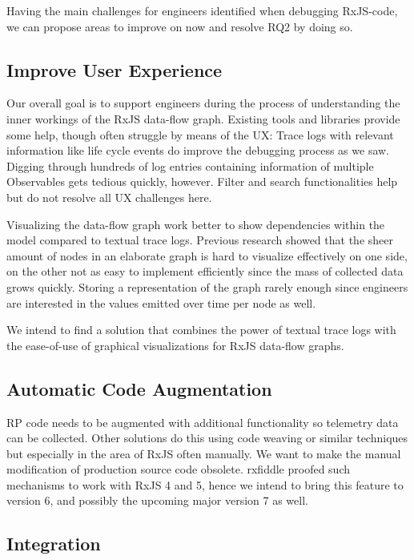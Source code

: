 \documentclass[12pt,a4paper]{article}
\begin{document}
Having the main challenges for engineers identified when debugging RxJS-code, we can propose areas to improve on now and resolve RQ2 by doing so.

\subsection{Improve User Experience}

Our overall goal is to support engineers during the process of understanding the inner workings of the RxJS data-flow graph. Existing tools and libraries provide some help, though often struggle by means of the UX: Trace logs with relevant information like life cycle events do improve the debugging process as we saw. Digging through hundreds of log entries containing information of multiple Observables gets tedious quickly, however. Filter and search functionalities help but do not resolve all UX challenges here.

Visualizing the data-flow graph work better to show dependencies within the model compared to textual trace logs. Previous research showed that the sheer amount of nodes in an elaborate graph is hard to visualize effectively \cite{10.1145/3180155.3180156} on one side, on the other not as easy to implement efficiently since the mass of collected data grows quickly. Storing a representation of the graph rarely enough since engineers are interested in the values emitted over time per node as well.

We intend to find a solution that combines the power of textual trace logs with the ease-of-use of graphical visualizations for RxJS data-flow graphs.

\subsection{Automatic Code Augmentation}

RP code needs to be augmented with additional functionality so telemetry data can be collected. Other solutions do this using code weaving\cite{10.1145/2884781.2884815} or similar techniques\cite{10.1145/3180155.3180156} but especially in the area of RxJS often manually. We want to make the manual modification of production source code obsolete. rxfiddle proofed such mechanisms to work with RxJS 4 and 5, hence we intend to bring this feature to version 6, and possibly the upcoming major version 7 as well.

\subsection{Integration}
\end{document}
